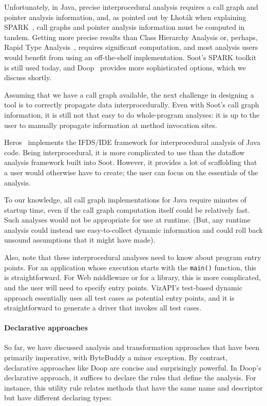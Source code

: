 Unfortunately, in Java, precise interprocedural analysis requires a
call graph and pointer analysis information, and, as pointed out by
Lhot\'ak when explaining SPARK~\cite{lhot02}, call graphs and pointer analysis information must be
computed in tandem. Getting more precise results than Class Hierarchy
Analysis or, perhaps, Rapid Type
Analysis~\cite{bacon96:_fast_static_analy_c_virtual_funct_calls},
requires significant computation, and most analysis users would
benefit from using an off-the-shelf implementation. Soot's SPARK
toolkit is still used today, and
Doop~\cite{bravenboer09:_stric_declar_specif_sophis_point_analy}
provides more sophisticated options, which we discuss shortly.

Assuming that we have a call graph available, the next challenge in
designing a tool is to correctly propagate data interprocedurally.
Even with Soot's call graph information, it is still not that easy to
do whole-program analyses: it is up to the user to manually propagate
information at method invocation sites.

Heros~\cite{bodden12:_inter_proced_data_flow_analy} implements the
IFDS/IDE framework for interprocedural analysis of Java code. Being
interprocedural, it is more complicated to use than the dataflow analysis
framework built into Soot. However, it provides a lot of scaffolding
that a user would otherwise have to create; the user can focus on the
essentials of the analysis.

To our knowledge, all call graph implementations for Java require
minutes of startup time, even if the call graph computation itself
could be relatively fast. Such analyses would not be appropriate for
use at runtime. (But, any runtime analysis could instead use
easy-to-collect dynamic information and could roll back unsound
assumptions that it might have made).

Also, note that these interprocedural analyses need to know about
program entry points.  For an application whose execution starts with the \texttt{main()}
function, this is straightforward.  For Web middleware or for a
library, this is more complicated, and the user will need to specify
entry points. VizAPI's test-based dynamic approach essentially uses
all test cases as potential entry points, and it is 
straightforward to generate a driver that invokes all test cases.

\paragraph{Declarative approaches}
So far, we have discussed analysis and transformation approaches that have
been primarily imperative, with ByteBuddy a minor exception. By contrast,
declarative approaches like Doop are concise and surprisingly powerful.
In Doop's declarative approach, it suffices to declare the rules that
define the analysis. For instance, this utility rule relates methods
that have the same name and descriptor but have different declaring types:


